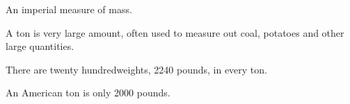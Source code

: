 An imperial measure of mass.  
\par
A ton is very large amount, often used to measure out coal, potatoes and other large 
quantities.

\par
There are twenty hundredweights,  2240 pounds, in every ton. 

\par
An American ton is only 2000 pounds.
